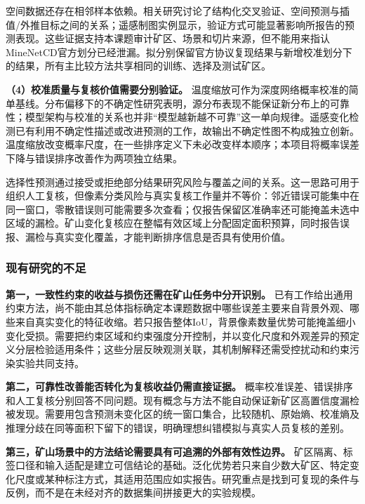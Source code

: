 空间数据还存在相邻样本依赖。相关研究讨论了结构化交叉验证、空间预测与插值/外推目标之间的关系\cite{Roberts2017CV,Valavi2019BlockCV,Mila2022Nearest}；遥感制图实例显示，验证方式可能显著影响所报告的预测表现\cite{Ploton2020Spatial}。这些证据支持本课题审计矿区、场景和切片来源，但不能用来指认MineNetCD官方划分已经泄漏。拟分别保留官方协议复现结果与新增校准划分下的结果，所有主比较方法共享相同的训练、选择及测试矿区。

\textbf{（4）校准质量与复核价值需要分别验证。}
温度缩放可作为深度网络概率校准的简单基线\cite{Guo2017Calibration}。分布偏移下的不确定性研究表明，源分布表现不能保证新分布上的可靠性\cite{Ovadia2019Uncertainty}；模型架构与校准的关系也并非“模型越新越不可靠”这一单向规律\cite{Minderer2021Calibration}。遥感变化检测已有利用不确定性描述或改进预测的工作\cite{Li2025Uncertainty}，故输出不确定性图不构成独立创新。温度缩放改变概率尺度，在一些排序定义下未必改变样本顺序；本项目将概率误差下降与错误排序改善作为两项独立结果。

选择性预测通过接受或拒绝部分结果研究风险与覆盖之间的关系\cite{Geifman2019SelectiveNet,Gangrade2021Selective,Franc2023Reject}。这一思路可用于组织人工复核，但像素分类风险与真实复核工作量并不等价：邻近错误可能集中在同一窗口，零散错误则可能需要多次查看；仅报告保留区准确率还可能掩盖未选中区域的漏检。矿山变化复核应在整幅有效区域上分配固定面积预算，同时报告误报、漏检与真实变化覆盖，才能判断排序信息是否具有使用价值。

\subsubsection{现有研究的不足}
\textbf{第一，一致性约束的收益与损伤还需在矿山任务中分开识别。}
已有工作给出通用约束方法，尚不能由其总体指标确定本课题数据中哪些误差主要来自背景外观、哪些来自真实变化的特征收缩。若只报告整体IoU，背景像素数量优势可能掩盖细小变化受损。需要把约束区域和约束强度分开控制，并以变化尺度和外观差异的预定义分层检验适用条件；这些分层反映观测关联，其机制解释还需受控扰动和约束污染实验共同支持。

\textbf{第二，可靠性改善能否转化为复核收益仍需直接证据。}
概率校准误差、错误排序和人工复核分别回答不同问题。现有概念与方法不能自动保证新矿区高置信度漏检被发现。需要用包含预测未变化区的统一窗口集合，比较随机、原始熵、校准熵及推理分歧在同等面积下留下的错误，明确理想纠错模拟与真实人员复核的差别。

\textbf{第三，矿山场景中的方法结论需要具有可追溯的外部有效性边界。}
矿区隔离、标签口径和输入适配是建立可信结论的基础。泛化优势若只来自少数大矿区、特定变化尺度或某种标注方式，其适用范围应如实报告。研究重点是找到可复现的条件与反例，而不是在未经对齐的数据集间拼接更大的实验规模。

